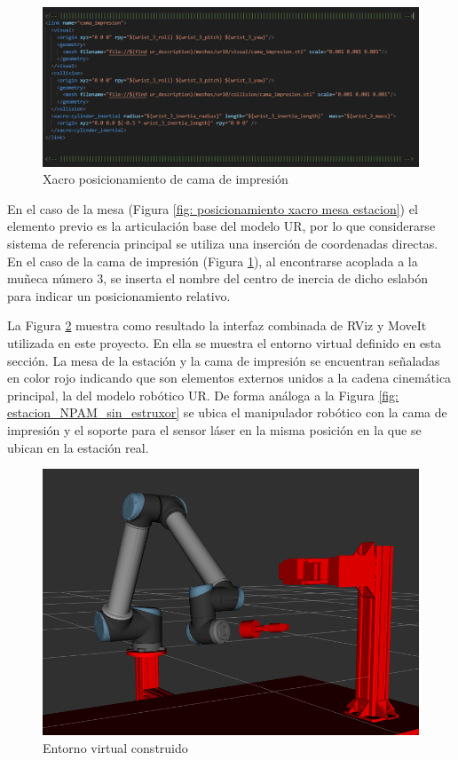 \begin{figure}[h!]
    \centering
    \includegraphics[scale=0.50]{figuras/posicionamiento xacro cama impresion.png}
    \caption{Xacro posicionamiento de cama de impresión}
    \label{fig: poscionamiento xacro cama impresión}
\end{figure}

En el caso de la mesa (Figura \ref{fig: posicionamiento xacro mesa estacion}) el elemento previo es la articulación base  del modelo UR, por lo que considerarse sistema de referencia principal se utiliza una inserción de coordenadas directas. En el caso de la cama de impresión (Figura \ref{fig: poscionamiento xacro cama impresión}), al encontrarse acoplada a la muñeca número 3, se inserta el nombre del centro de inercia de dicho eslabón para indicar un posicionamiento relativo.

La Figura \ref{fig: entorno virtual robot mesa cama} muestra como resultado la interfaz combinada de RViz y MoveIt utilizada en este proyecto. En ella se muestra el entorno virtual definido en esta sección. La mesa de la estación y la cama de impresión se encuentran señaladas en color rojo indicando que son elementos externos unidos a la cadena cinemática principal, la del modelo robótico UR. De forma análoga a la Figura \ref{fig: estacion_NPAM_sin_estruxor} se ubica el manipulador robótico con la cama de impresión y el soporte para el sensor láser en la misma posición en la que se ubican en la estación real.

\begin{figure}[h!]
    \centering
    \includegraphics[scale=0.30]{figuras/entorno_virutal_cad_cama.png}
    \caption{Entorno virtual construido}
    \label{fig: entorno virtual robot mesa cama}
\end{figure}

